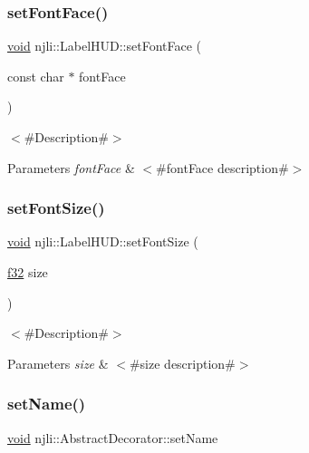\subsubsection{\texorpdfstring{set\+Font\+Face()}{setFontFace()}}
{\footnotesize\ttfamily \mbox{\hyperlink{_thread_8h_af1e856da2e658414cb2456cb6f7ebc66}{void}} njli\+::\+Label\+H\+U\+D\+::set\+Font\+Face (\begin{DoxyParamCaption}\item[{const char $\ast$}]{font\+Face }\end{DoxyParamCaption})}

$<$\#\+Description\#$>$


\begin{DoxyParams}{Parameters}
{\em font\+Face} & $<$\#font\+Face description\#$>$ \\
\hline
\end{DoxyParams}
\mbox{\label{classnjli_1_1_label_h_u_d_ac684499e98df76e0554bf882588df45b}} 
\subsubsection{\texorpdfstring{set\+Font\+Size()}{setFontSize()}}
{\footnotesize\ttfamily \mbox{\hyperlink{_thread_8h_af1e856da2e658414cb2456cb6f7ebc66}{void}} njli\+::\+Label\+H\+U\+D\+::set\+Font\+Size (\begin{DoxyParamCaption}\item[{\mbox{\hyperlink{_util_8h_a5f6906312a689f27d70e9d086649d3fd}{f32}}}]{size }\end{DoxyParamCaption})}

$<$\#\+Description\#$>$


\begin{DoxyParams}{Parameters}
{\em size} & $<$\#size description\#$>$ \\
\hline
\end{DoxyParams}
\mbox{\label{classnjli_1_1_label_h_u_d_a087eb5f8d9f51cc476f12f1d10a3cb95}} 
\subsubsection{\texorpdfstring{set\+Name()}{setName()}}
{\footnotesize\ttfamily \mbox{\hyperlink{_thread_8h_af1e856da2e658414cb2456cb6f7ebc66}{void}} njli\+::\+Abstract\+Decorator\+::set\+Name}

